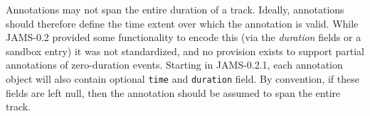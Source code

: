 \documentclass{article}
\begin{document}




Annotations may not span the entire duration of a track.  
Ideally, annotations should therefore define the time extent over which the annotation is valid.  
While JAMS-0.2 provided some functionality to encode this (via the \emph{duration} fields or a sandbox entry) it was not standardized, and no provision exists to support partial annotations of zero-duration events.
Starting in JAMS-0.2.1, each annotation object will also contain optional \texttt{time} and \texttt{duration} field.  
By convention, if these fields are left null, then the annotation should be assumed to span the entire track.





\end{document}
